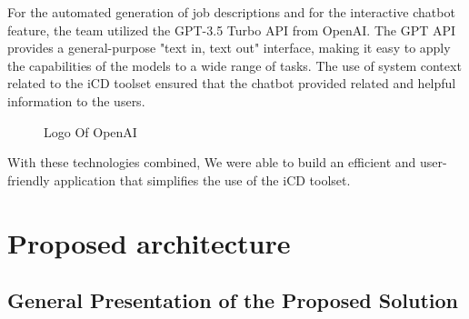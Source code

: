 For the automated generation of job descriptions and for the interactive chatbot feature, the team utilized the {\color{purple}GPT-3.5 Turbo API} from OpenAI. The GPT API provides a general-purpose "text in, text out" interface, making it easy to apply the capabilities of the models to a wide range of tasks. The use of system context related to the iCD toolset ensured that the chatbot provided related and helpful information to the users.

\begin{figure}[H]
    \centering
    \caption{  Logo Of OpenAI }
    \label{fig: OpenAI_Logo}
\end{figure}

With these technologies combined, We were able to build an efficient and user-friendly application that simplifies the use of the iCD toolset.


\section{Proposed architecture}
\subsection{General Presentation of the Proposed Solution}



